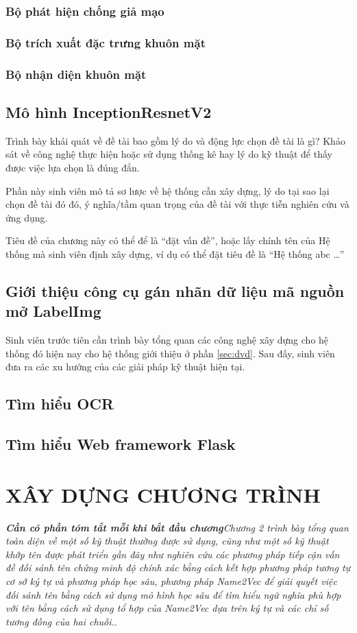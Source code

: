 \subsubsection*{Bộ phát hiện chống giả mạo}
\subsubsection*{Bộ trích xuất đặc trưng khuôn mặt}
\subsubsection*{Bộ nhận diện khuôn mặt}

\subsection*{Mô hình InceptionResnetV2}

Trình bày khái quát về đề tài bao gồm lý do và động lực chọn đề tài là gì? Khảo sát về công nghệ thực hiện hoặc sử dụng thống kê hay lý do kỹ thuật để thấy được việc lựa chọn là đúng đắn.


Phần này sinh viên mô tả sơ lược về hệ thống cần xây dựng, lý do tại sao lại chọn đề tài đó  đó, ý nghĩa/tầm quan trọng của đề tài với thực tiễn nghiên cứu và ứng dụng.

Tiêu đề của chương này có thể để là ``đặt vấn đề'', hoặc lấy chính tên của Hệ thống mà sinh viên định xây dựng, ví dụ có thể đặt tiêu đề là ``Hệ thống abc …” 


\subsection*{Giới thiệu công cụ gán nhãn dữ liệu mã nguồn mở LabelImg}
Sinh viên trước tiên cần trình bày tổng quan các công nghệ xây dựng cho hệ thống đó hiện nay cho hệ thống giới thiệu ở phần \ref{sec:dvd}. Sau đấy, sinh viên đưa ra các xu hướng của các giải pháp kỹ thuật hiện tại. 
\subsection*{Tìm hiểu OCR}
\subsection*{Tìm hiểu Web framework Flask}


\section{XÂY DỰNG CHƯƠNG TRÌNH}
\textbf{\textit{Cần có phần tóm tắt mỗi khi bắt đầu chương}}\textit{Chương 2 trình bày tổng quan toàn diện về một số kỹ thuật thường được sử dụng, cũng như một số kỹ thuật khớp tên được phát triển gần đây như nghiên cứu các phương pháp tiếp cận vấn đề đối sánh tên chứng minh độ chính xác bằng cách kết hợp phương pháp tương tự cơ sở ký tự và phương pháp học sâu, phương pháp Name2Vec để giải quyết việc đối sánh tên bằng cách sử dụng mô hình học sâu để tìm hiểu ngữ nghĩa phù hợp với tên bằng cách sử dụng tổ hợp của Name2Vec dựa trên ký tự và các chỉ số tương đồng của hai chuỗi.}.

